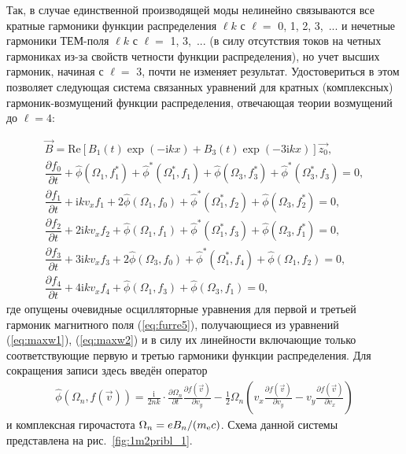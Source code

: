 Так, в случае единственной производящей моды нелинейно связываются все кратные гармоники функции распределения $\ell k$ с $\ell =$ 0, 1, 2, 3,~... и нечетные гармоники ТЕМ-поля $\ell k$ с $\ell =$ 1, 3,~... (в силу отсутствия токов на четных гармониках из-за свойств четности функции распределения), но учет высших гармоник, начиная с $\ell =$ 3, почти не изменяет результат.  
Удостовериться в этом позволяет следующая система связанных уравнений для кратных (комплексных) гармоник-возмущений функции распределения, отвечающая теории возмущений до $\ell = 4$:

\begin{align}
\label{eq:furre5}
\vec{B} = \mathrm{Re} \left[ B_1(t) \exp(-\mathrm{i}kx)+B_3(t)\exp(-3\mathrm{i}kx)\right] \vec{z_0} ,\\
\label{eq:f0.1}
\dfrac{\partial f_0}{\partial t}+\hat \phi(\Omega_1,f_1^*)+\hat \phi^*(\Omega_1^*,f_1)+\hat \phi(\Omega_3,f_3^*)+\hat \phi^*(\Omega_3^*,f_3)=0,\\
\label{eq:f1.1}
\dfrac{\partial f_1}{\partial t}+\mathrm{i}kv_xf_1+2\hat \phi(\Omega_1,f_0)+\hat \phi^*(\Omega_1^*,f_2)+\hat \phi(\Omega_3,f_2^*)=0,\\
\label{eq:f2.1}
\dfrac{\partial f_2}{\partial t}+2\mathrm{i}kv_xf_2+\hat \phi(\Omega_1,f_1)+\hat \phi^*(\Omega_1^*,f_3)+\hat \phi(\Omega_3,f_1^*)=0,\\
\label{eq:f3.1}
\dfrac{\partial f_3}{\partial t}+3\mathrm{i}kv_xf_3+2\hat \phi(\Omega_3,f_0)+\hat \phi^*(\Omega_1^*,f_4)+\hat \phi(\Omega_1,f_2)=0,\\
\label{eq:f4.1}
\dfrac{\partial f_4}{\partial t}+4\mathrm{i}kv_xf_4+\hat \phi(\Omega_1,f_3)+\hat \phi(\Omega_3,f_1)=0,
\end{align}
где опущены очевидные осцилляторные уравнения для первой и третьей гармоник магнитного поля (\ref{eq:furre5}), получающиеся из уравнений (\ref{eq:maxw1}), (\ref{eq:maxw2}) и в силу их линейности включающие только соответствующие первую и третью гармоники функции распределения. 
Для сокращения записи здесь введён оператор
\begin{align}
\label{eq:oper.1}
    \hat{\phi}(\Omega_{n},f(\vec{v}))  =  \frac{\mathrm{i}}{2nk}\cdot\frac{\partial \Omega_{n}}{\partial t}\frac{\partial f(\vec{v})}{\partial v_y} -\frac{1}{2}\Omega_{n} \left(v_x\frac{\partial f(\vec{v})}{\partial v_y}-v_y\frac{\partial f(\vec{v})}{\partial v_x}\right)
\end{align}
и комплексная гирочастота $\Omega_n={e B_n}/{(m_\mathrm{e} c)}$.
Схема данной системы представлена на рис.~\ref{fig:1m2pribl_1}.
